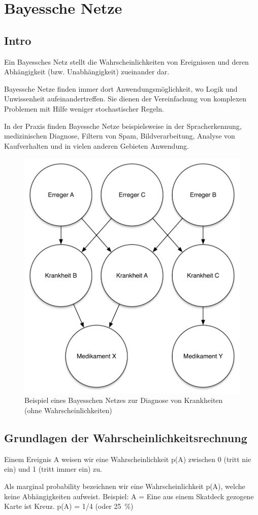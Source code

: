 
\chapter{Bayessche Netze}
\section{Intro}
Ein Bayessches Netz stellt die Wahrscheinlichkeiten von Ereignissen und deren Abhängigkeit (bzw. Unabhängigkeit) zueinander dar.

Bayessche Netze finden immer dort Anwendungsmöglichkeit, wo Logik und Unwissenheit aufeinandertreffen.
Sie dienen der Vereinfachung von komplexen Problemen mit Hilfe weniger stochastischer Regeln.

In der Praxis finden Bayessche Netze beispielsweise in der Spracherkennung, medizinischen Diagnose, Filtern von Spam, Bildverarbeitung, Analyse von Kaufverhalten und in vielen anderen Gebieten Anwendung.

\begin{figure}[h]
    \centering
    \includegraphics[width=.4\textwidth]{chapters/bayes/bayes_intro.pdf}
    \caption{Beispiel eines Bayesschen Netzes zur Diagnose von Krankheiten (ohne Wahrscheinlichkeiten)}
\end{figure}

\section{Grundlagen der Wahrscheinlichkeitsrechnung}
Einem Ereignis A weisen wir eine Wahrscheinlichkeit p(A) zwischen 0 (tritt nie ein) und 1 (tritt immer ein) zu.

Als marginal probability bezeichnen wir eine Wahrscheinlichkeit p(A), welche keine Abhängigkeiten aufweist.
Beispiel: A = Eine aus einem Skatdeck gezogene Karte ist Kreuz.
p(A) = 1/4 (oder 25~\%)

